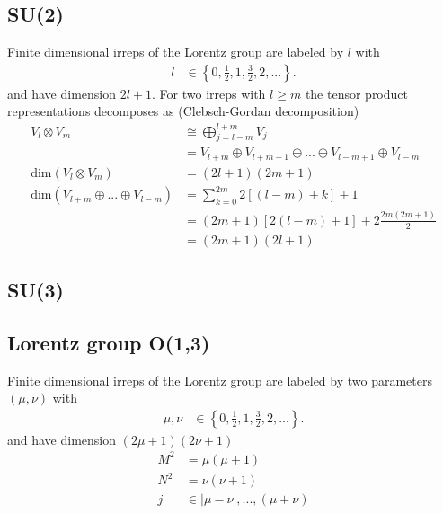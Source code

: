 \documentclass[10pt,a4paper]{article}
\theoremstyle{definition}
\begin{document}
\subsection{SU(2)}
Finite dimensional irreps of the Lorentz group are labeled by $l$ with
\begin{align}
    l &\in \left\{0,\frac{1}{2},1,\frac{3}{2},2,...\right\}.
\end{align}
and have dimension $2l+1$. For two irreps with $l\ge m$ the tensor product representations decomposes as ({\sc Clebsch-Gordan} decomposition)
\begin{align}
    V_l \otimes V_m &\cong \bigoplus_{j=l-m}^{l+m} V_j\\
    &=V_{l+m}\oplus V_{l+m-1}\oplus ... \oplus V_{l-m+1}\oplus V_{l-m}\\
    \text{dim}(V_l \otimes V_m)&=(2l+1)(2m+1)\\
    \text{dim}(V_{l+m} \oplus ...\oplus V_{l-m})&=\sum_{k=0}^{2m}2[(l-m)+k]+1\\
    &=(2m+1)[2(l-m)+1]+2\frac{2m(2m+1)}{2}\\
    &=(2m+1)(2l+1)
\end{align}

\subsection{SU(3)}

\subsection{Lorentz group O(1,3)}
Finite dimensional irreps of the Lorentz group are labeled by two parameters $(\mu,\nu)$ with
\begin{align}
    \mu,\nu &\in \left\{0,\frac{1}{2},1,\frac{3}{2},2,...\right\}.
\end{align}
and have dimension $(2\mu+1)(2\nu+1)$
\begin{align*}
    M^2&=\mu(\mu+1)\\
    N^2&=\nu(\nu+1)\\
    j  &\in |\mu-\nu|, ..., (\mu+\nu)
\end{align*}
\end{document}

